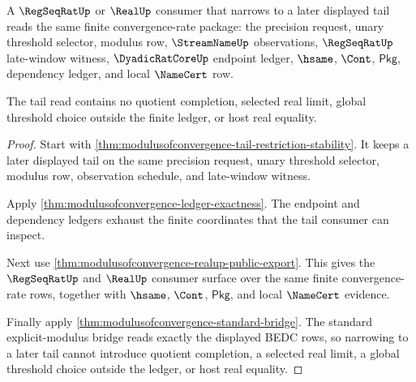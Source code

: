 \begin{theorem}
\label{thm:modulusofconvergence-mature-tail-consumer-example}
A $\RegSeqRatUp$ or $\RealUp$ consumer that narrows to a later displayed tail
reads the same finite convergence-rate package: the precision request, unary
threshold selector, modulus row, $\StreamNameUp$ observations,
$\RegSeqRatUp$ late-window witness, $\DyadicRatCoreUp$ endpoint ledger,
$\hsame$, $\Cont$, $\mathsf{Pkg}$, dependency ledger, and local $\NameCert$
row.

The tail read contains no quotient completion, selected real limit, global
threshold choice outside the finite ledger, or host real equality.
\end{theorem}
\begin{proof}
Start with \autoref{thm:modulusofconvergence-tail-restriction-stability}. It
keeps a later displayed tail on the same precision request, unary threshold
selector, modulus row, observation schedule, and late-window witness.

Apply \autoref{thm:modulusofconvergence-ledger-exactness}. The endpoint and
dependency ledgers exhaust the finite coordinates that the tail consumer can
inspect.

Next use \autoref{thm:modulusofconvergence-realup-public-export}. This gives
the $\RegSeqRatUp$ and $\RealUp$ consumer surface over the same finite
convergence-rate rows, together with $\hsame$, $\Cont$, $\mathsf{Pkg}$, and
local $\NameCert$ evidence.

Finally apply \autoref{thm:modulusofconvergence-standard-bridge}. The standard
explicit-modulus bridge reads exactly the displayed BEDC rows, so narrowing to
a later tail cannot introduce quotient completion, a selected real limit, a
global threshold choice outside the ledger, or host real equality.
\end{proof}

